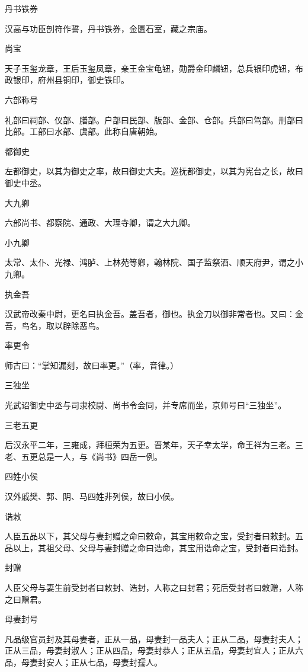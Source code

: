\documentclass[a4paper,12pt,UTF8,twoside]{ctexbook}
\begin{document}
    丹书铁券
    
    汉高与功臣剖符作誓，丹书铁券，金匮石室，藏之宗庙。
    
    尚宝
    
    天子玉玺龙章，王后玉玺凤章，亲王金宝龟钮，勋爵金印麟钮，总兵银印虎钮，布政银印，府州县铜印，御史铁印。
    
    六部称号
    
    礼部曰祠部、仪部、膳部。户部曰民部、版部、金部、仓部。兵部曰驾部。刑部曰比部。工部曰水部、虞部。此称自唐朝始。
    
    都御史
    
    左都御史，以其为御史之率，故曰御史大夫。巡抚都御史，以其为宪台之长，故曰御史中丞。
    
    大九卿
    
    六部尚书、都察院、通政、大理寺卿，谓之大九卿。
    
    小九卿
    
    太常、太仆、光禄、鸿胪、上林苑等卿，翰林院、国子监祭酒、顺天府尹，谓之小九卿。
    
    执金吾
    
    汉武帝改秦中尉，更名曰执金吾。盖吾者，御也。执金刀以御非常者也。又曰：金吾，鸟名，取以辟除恶鸟。
    
    率更令
    
    师古曰：“掌知漏刻，故曰率更。”（率，音律。）
    
    三独坐
    
    光武诏御史中丞与司隶校尉、尚书令会同，并专席而坐，京师号曰“三独坐”。
    
    三老五更
    
    后汉永平二年，三雍成，拜桓荣为五更。晋某年，天子幸太学，命王祥为三老。三老、五更总是一人，与《尚书》四岳一例。
    
    四姓小侯
    
    汉外戚樊、郭、阴、马四姓非列侯，故曰小侯。
    
    诰敕
    
    人臣五品以下，其父母与妻封赠之命曰敕命，其宝用敕命之宝，受封者曰敕封。五品以上，其祖父母、父母与妻封赠之命曰诰命，其宝用诰命之宝，受封者曰诰封。
    
    封赠
    
    人臣父母与妻生前受封者曰敕封、诰封，人称之曰封君；死后受封者曰敕赠，人称之曰赠君。
    
    母妻封号
    
    凡品级官员封及其母妻者，正从一品，母妻封一品夫人；正从二品，母妻封夫人；正从三品，母妻封淑人；正从四品，母妻封恭人；正从五品，母妻封宜人；正从六品，母妻封安人；正从七品，母妻封孺人。
    
\end{document}
